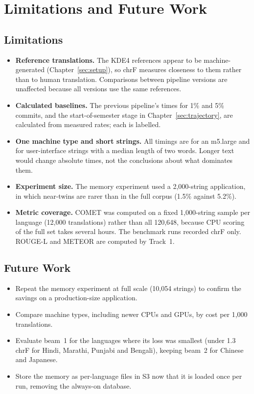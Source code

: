 \section{Limitations and Future Work}
\label{sec:limitations}

\subsection{Limitations}
\begin{itemize}
  \item \textbf{Reference translations.} The KDE4 references appear to be machine-generated (Chapter~\ref{sec:setup}), so
        chrF measures closeness to them rather than to human translation. Comparisons between pipeline versions are
        unaffected because all versions use the same references.
  \item \textbf{Calculated baselines.} The previous pipeline's times for 1\% and 5\% commits, and the start-of-semester
        stage in Chapter~\ref{sec:trajectory}, are calculated from measured rates; each is labelled.
  \item \textbf{One machine type and short strings.} All timings are for an m5.large and for user-interface strings with
        a median length of two words. Longer text would change absolute times, not the conclusions about what dominates them.
  \item \textbf{Experiment size.} The memory experiment used a 2,000-string application, in which near-twins are rarer
        than in the full corpus (1.5\% against 5.2\%).
  \item \textbf{Metric coverage.} COMET was computed on a fixed 1,000-string sample per language (12,000 translations)
        rather than all 120,648, because CPU scoring of the full set takes several hours. The benchmark runs recorded chrF
        only. ROUGE-L and METEOR are computed by Track~1.
\end{itemize}

\subsection{Future Work}
\begin{itemize}
  \item Repeat the memory experiment at full scale (10,054 strings) to confirm the savings on a production-size application.
  \item Compare machine types, including newer CPUs and GPUs, by cost per 1,000 translations.
  \item Evaluate beam~1 for the languages where its loss was smallest (under 1.3 chrF for Hindi, Marathi, Punjabi and
        Bengali), keeping beam~2 for Chinese and Japanese.
  \item Store the memory as per-language files in S3 now that it is loaded once per run, removing the always-on database.
\end{itemize}
